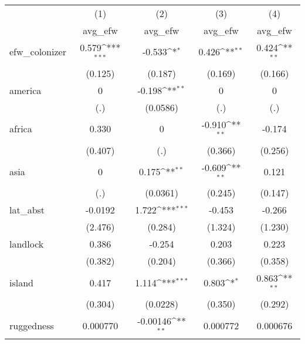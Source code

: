 {
\def\sym#1{\ifmmode^{#1}\else\(^{#1}\)\fi}
\begin{tabular}{l*{4}{c}}
\hline\hline
            &\multicolumn{1}{c}{(1)}&\multicolumn{1}{c}{(2)}&\multicolumn{1}{c}{(3)}&\multicolumn{1}{c}{(4)}\\
            &\multicolumn{1}{c}{avg\_efw}&\multicolumn{1}{c}{avg\_efw}&\multicolumn{1}{c}{avg\_efw}&\multicolumn{1}{c}{avg\_efw}\\
\hline
efw\_colonizer&       0.579\sym{***}&      -0.533\sym{*}  &       0.426\sym{**} &       0.424\sym{**} \\
            &     (0.125)         &     (0.187)         &     (0.169)         &     (0.166)         \\
[1em]
america     &           0         &      -0.198\sym{**} &           0         &           0         \\
            &         (.)         &    (0.0586)         &         (.)         &         (.)         \\
[1em]
africa      &       0.330         &           0         &      -0.910\sym{**} &      -0.174         \\
            &     (0.407)         &         (.)         &     (0.366)         &     (0.256)         \\
[1em]
asia        &           0         &       0.175\sym{**} &      -0.609\sym{**} &       0.121         \\
            &         (.)         &    (0.0361)         &     (0.245)         &     (0.147)         \\
[1em]
lat\_abst    &     -0.0192         &       1.722\sym{***}&      -0.453         &      -0.266         \\
            &     (2.476)         &     (0.284)         &     (1.324)         &     (1.230)         \\
[1em]
landlock    &       0.386         &      -0.254         &       0.203         &       0.223         \\
            &     (0.382)         &     (0.204)         &     (0.366)         &     (0.358)         \\
[1em]
island      &       0.417         &       1.114\sym{***}&       0.803\sym{*}  &       0.863\sym{**} \\
            &     (0.304)         &    (0.0228)         &     (0.350)         &     (0.292)         \\
[1em]
ruggedness  &    0.000770         &    -0.00146\sym{**} &    0.000772         &    0.000676         \\

\end{tabular}}

